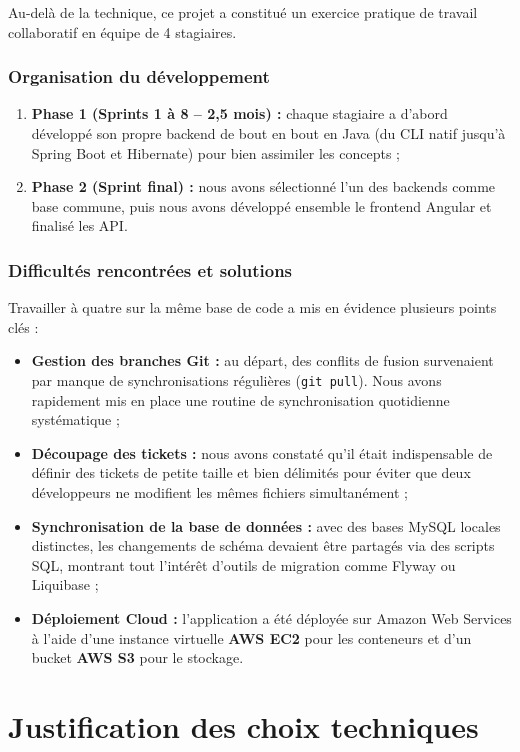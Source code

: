 \documentclass{tnreport}
\begin{document}
Au-delà de la technique, ce projet a constitué un exercice pratique de travail collaboratif en équipe de 4 stagiaires.

\subsubsection{Organisation du développement}
\begin{enumerate}
    \item \textbf{Phase 1 (Sprints 1 à 8 -- 2,5 mois) :} chaque stagiaire a d'abord développé son propre backend de bout en bout en Java (du CLI natif jusqu'à Spring Boot et Hibernate) pour bien assimiler les concepts ;
    \item \textbf{Phase 2 (Sprint final) :} nous avons sélectionné l'un des backends comme base commune, puis nous avons développé ensemble le frontend Angular et finalisé les API.
\end{enumerate}

\subsubsection{Difficultés rencontrées et solutions}
Travailler à quatre sur la même base de code a mis en évidence plusieurs points clés :
\begin{itemize}
    \item \textbf{Gestion des branches Git :} au départ, des conflits de fusion survenaient par manque de synchronisations régulières (\texttt{git pull}). Nous avons rapidement mis en place une routine de synchronisation quotidienne systématique ;
    \item \textbf{Découpage des tickets :} nous avons constaté qu'il était indispensable de définir des tickets de petite taille et bien délimités pour éviter que deux développeurs ne modifient les mêmes fichiers simultanément ;
    \item \textbf{Synchronisation de la base de données :} avec des bases MySQL locales distinctes, les changements de schéma devaient être partagés via des scripts SQL, montrant tout l'intérêt d'outils de migration comme Flyway ou Liquibase ;
    \item \textbf{Déploiement Cloud :} l'application a été déployée sur Amazon Web Services à l'aide d'une instance virtuelle \textbf{AWS EC2} pour les conteneurs et d'un bucket \textbf{AWS S3} pour le stockage.
\end{itemize}

\section{Justification des choix techniques}
\label{sec:choix_techniques_quiz}
\end{document}
